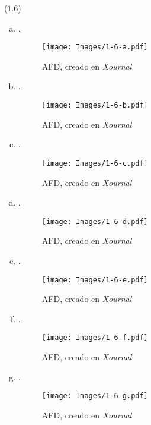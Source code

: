 \begin{mdframed}[style = warning]
	\begin{problem}
		($1.6$)
		\begin{enumerate}[a)]
			\item .
				\begin{figure}[H]
					\centering
					\texttt{[image: Images/1-6-a.pdf]}
					\caption{AFD, creado en \textit{Xournal}}
					\label{1-6-a}
				\end{figure}
				
			\item .
				\begin{figure}[H]
					\centering
					\texttt{[image: Images/1-6-b.pdf]}
					\caption{AFD, creado en \textit{Xournal}}
					\label{1-6-b}
				\end{figure}
				
			\item .
				\begin{figure}[H]
					\centering
					\texttt{[image: Images/1-6-c.pdf]}
					\caption{AFD, creado en \textit{Xournal}}
					\label{1-6-c}
				\end{figure}
				
			\item .		
				\begin{figure}[H]
					\centering
					\texttt{[image: Images/1-6-d.pdf]}
					\caption{AFD, creado en \textit{Xournal}}
					\label{1-6-d}
				\end{figure}
				
			\item .		
				\begin{figure}[H]
					\centering
					\texttt{[image: Images/1-6-e.pdf]}
					\caption{AFD, creado en \textit{Xournal}}
					\label{1-6-e}
				\end{figure}
				
			\item .		
				\begin{figure}[H]
					\centering
					\texttt{[image: Images/1-6-f.pdf]}
					\caption{AFD, creado en \textit{Xournal}}
					\label{1-6-f}
				\end{figure}
				
			\item .		
				\begin{figure}[H]
					\centering
					\texttt{[image: Images/1-6-g.pdf]}
					\caption{AFD, creado en \textit{Xournal}}
					\label{1-6-g}
				\end{figure}
				

\end{enumerate}
\end{problem}
\end{mdframed}
